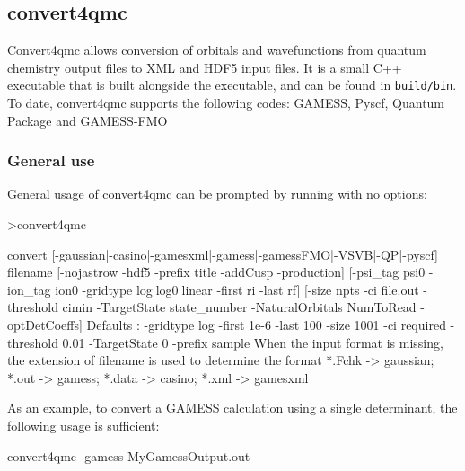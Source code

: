 \subsection{convert4qmc}
\label{sec:convert4qmc}
Convert4qmc allows conversion of orbitals and wavefunctions from
quantum chemistry output files to \qmcpack XML and HDF5 input files.
It is a small C++ executable that is built alongside the \qmcpack
executable, and can be found in \texttt{build/bin}.\\

To date, convert4qmc supports the following codes:
GAMESS\cite{schmidt93}, Pyscf\cite{Sun2018}, Quantum Package\cite{QP}
and GAMESS-FMO\cite{Fedorov2004,schmidt93}


\subsubsection{General use}
General usage of convert4qmc can be prompted by running with no options:

\begin{shade}
>convert4qmc

 convert [-gaussian|-casino|-gamesxml|-gamess|-gamessFMO|-VSVB|-QP|-pyscf]
 filename                                                          
[-nojastrow -hdf5 -prefix title -addCusp -production]                                                                                           
[-psi_tag psi0 -ion_tag ion0 -gridtype log|log0|linear -first ri -last rf]
[-size npts -ci file.out -threshold cimin -TargetState state_number
-NaturalOrbitals NumToRead -optDetCoeffs]                                        
Defaults : -gridtype log -first 1e-6 -last 100 -size 1001 -ci required 
-threshold 0.01 -TargetState 0 -prefix sample                                
When the input format is missing, the  extension of filename is used to determine
the format                                                      
 *.Fchk -> gaussian; *.out -> gamess; *.data -> casino; *.xml -> gamesxml
\end{shade}


As an example, to convert a GAMESS calculation using a single determinant, the following usage is sufficient:\\
\begin{shade}
convert4qmc -gamess MyGamessOutput.out
\end{shade}

